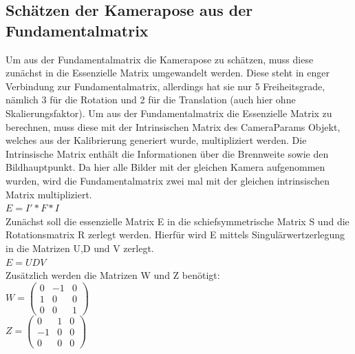 \subsection{Schätzen der Kamerapose aus der Fundamentalmatrix}
Um aus der Fundamentalmatrix die Kamerapose zu schätzen, muss diese zunächst in die Essenzielle Matrix umgewandelt werden. Diese steht in enger Verbindung zur Fundamentalmatrix, allerdings hat sie nur 5 Freiheitsgrade, nämlich 3 für die Rotation und 2 für die Translation (auch hier ohne Skalierungsfaktor). Um aus der Fundamentalmatrix die Essenzielle Matrix zu berechnen, muss diese mit der Intrinsischen Matrix des CameraParams Objekt, welches aus der Kalibrierung generiert wurde, multipliziert werden. Die Intrinsische Matrix enthält die Informationen über die Brennweite sowie den Bildhauptpunkt. Da hier alle Bilder mit der gleichen Kamera aufgenommen wurden, wird die Fundamentalmatrix zwei mal mit der gleichen intrinsischen Matrix multipliziert.
\\
$E = I' * F * I$
\\
Zunächst soll die essenzielle Matrix E in die schiefsymmetrische Matrix S und die Rotationsmatrix R zerlegt werden. Hierfür wird E mittels Singulärwertzerlegung in die Matrizen U,D und V zerlegt.
\\
$E = UDV$
\\
Zusätzlich werden die Matrizen W und Z benötigt:
\\
$W = \begin{pmatrix} 0 & -1 & 0 \\1 & 0 & 0\\0 & 0 & 1\end{pmatrix}$
\\
$Z = \begin{pmatrix} 0 & 1 & 0 \\-1 & 0 & 0\\0 & 0 & 0\end{pmatrix}$ 

